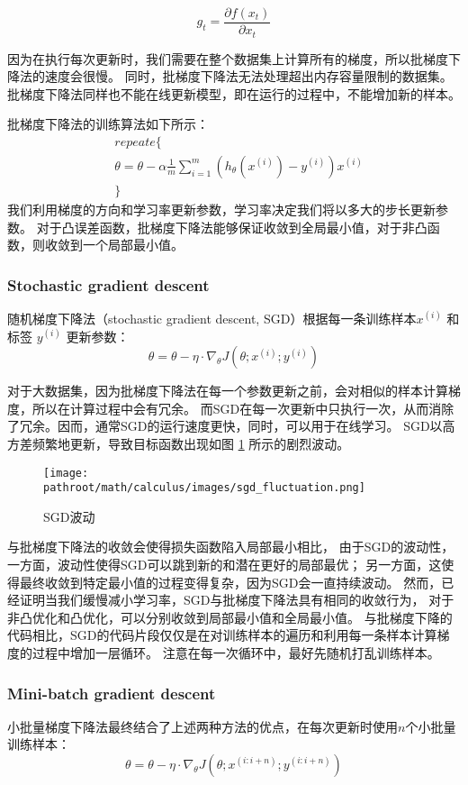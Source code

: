 \[
    g_{t} = \frac{\partial f(x_t)}{\partial x_t}
\]

因为在执行每次更新时，我们需要在整个数据集上计算所有的梯度，所以批梯度下降法的速度会很慢。
同时，批梯度下降法无法处理超出内存容量限制的数据集。
批梯度下降法同样也不能在线更新模型，即在运行的过程中，不能增加新的样本。

批梯度下降法的训练算法如下所示：
\begin{align*}
    & repeate \{ \\
    &    \theta = \theta - \alpha \frac{1}{m}{\sum_{i=1}^{m}{(h_{\theta}(x^{(i)}) - y^{(i)})x^{(i)}}} \\
    & \}
\end{align*}
我们利用梯度的方向和学习率更新参数，学习率决定我们将以多大的步长更新参数。
对于凸误差函数，批梯度下降法能够保证收敛到全局最小值，对于非凸函数，则收敛到一个局部最小值。


\subsubsection{Stochastic gradient descent}
随机梯度下降法（stochastic gradient descent, SGD）根据每一条训练样本$ x^{(i)}$ 和标签 $y^{(i)}$ 更新参数：
\[
    \theta = \theta - \eta \cdot \nabla_{\theta}{J(\theta;x^{(i)};y^{(i)})}
\]

对于大数据集，因为批梯度下降法在每一个参数更新之前，会对相似的样本计算梯度，所以在计算过程中会有冗余。
而SGD在每一次更新中只执行一次，从而消除了冗余。因而，通常SGD的运行速度更快，同时，可以用于在线学习。
SGD以高方差频繁地更新，导致目标函数出现如图 \ref{fig:sgd_fluctuation} 所示的剧烈波动。

\begin{figure}[H]
    \centering
    \texttt{[image: \\pathroot/math/calculus/images/sgd\_fluctuation.png]}
    \caption{SGD波动}
    \label{fig:sgd_fluctuation}
\end{figure}

与批梯度下降法的收敛会使得损失函数陷入局部最小相比，
由于SGD的波动性，一方面，波动性使得SGD可以跳到新的和潜在更好的局部最优；
另一方面，这使得最终收敛到特定最小值的过程变得复杂，因为SGD会一直持续波动。
然而，已经证明当我们缓慢减小学习率，SGD与批梯度下降法具有相同的收敛行为，
对于非凸优化和凸优化，可以分别收敛到局部最小值和全局最小值。
与批梯度下降的代码相比，SGD的代码片段仅仅是在对训练样本的遍历和利用每一条样本计算梯度的过程中增加一层循环。
注意在每一次循环中，最好先随机打乱训练样本。


\subsubsection{Mini-batch gradient descent}
小批量梯度下降法最终结合了上述两种方法的优点，在每次更新时使用$n$个小批量训练样本：
\[
    \theta = \theta - \eta \cdot \nabla_{\theta}{J(\theta;x^{(i:i+n)};y^{(i:i+n)})}
\]

